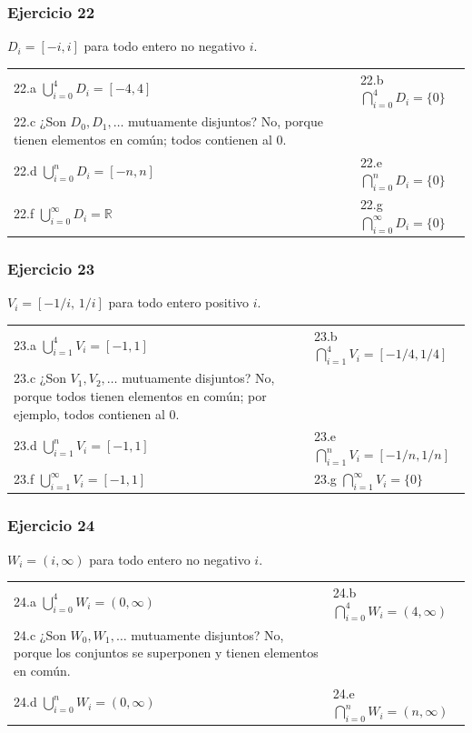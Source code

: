 \documentclass[12pt,a4paper]{article}
\begin{document}
\subsubsection*{\textcolor{accent}{Ejercicio 22}}
$D_i=[-i,i]$ para todo entero no negativo $i$.
\begin{center}\small
\begin{tabular}{ll}
22.a $\bigcup_{i=0}^4 D_i=[-4,4]$ & 22.b $\bigcap_{i=0}^4 D_i=\{0\}$ \\
22.c ¿Son $D_0,D_1,\dots$ mutuamente disjuntos? No, porque tienen elementos en común; todos contienen al $0$. \\
22.d $\bigcup_{i=0}^n D_i=[-n,n]$ & 22.e $\bigcap_{i=0}^n D_i=\{0\}$ \\
22.f $\bigcup_{i=0}^\infty D_i=\mathbb{R}$ & 22.g $\bigcap_{i=0}^\infty D_i=\{0\}$ \\
\end{tabular}
\end{center}

\subsubsection*{\textcolor{accent}{Ejercicio 23}}
$V_i=[-1/i,\,1/i]$ para todo entero positivo $i$.
\begin{center}\small
\begin{tabular}{ll}
23.a $\bigcup_{i=1}^4 V_i=[-1,1]$ & 23.b $\bigcap_{i=1}^4 V_i=[-1/4,1/4]$ \\
23.c ¿Son $V_1,V_2,\dots$ mutuamente disjuntos? No, porque todos tienen elementos en común; por ejemplo, todos contienen al $0$. \\
23.d $\bigcup_{i=1}^n V_i=[-1,1]$ & 23.e $\bigcap_{i=1}^n V_i=[-1/n,1/n]$ \\
23.f $\bigcup_{i=1}^\infty V_i=[-1,1]$ & 23.g $\bigcap_{i=1}^\infty V_i=\{0\}$ \\
\end{tabular}
\end{center}

\subsubsection*{\textcolor{accent}{Ejercicio 24}}
$W_i=(i,\infty)$ para todo entero no negativo $i$.
\begin{center}\small
\begin{tabular}{ll}
24.a $\bigcup_{i=0}^4 W_i=(0,\infty)$ & 24.b $\bigcap_{i=0}^4 W_i=(4,\infty)$ \\
24.c ¿Son $W_0,W_1,\dots$ mutuamente disjuntos? No, porque los conjuntos se superponen y tienen elementos en común. \\
24.d $\bigcup_{i=0}^n W_i=(0,\infty)$ & 24.e $\bigcap_{i=0}^n W_i=(n,\infty)$ \\
\end{tabular}
\end{center}
\end{document}
